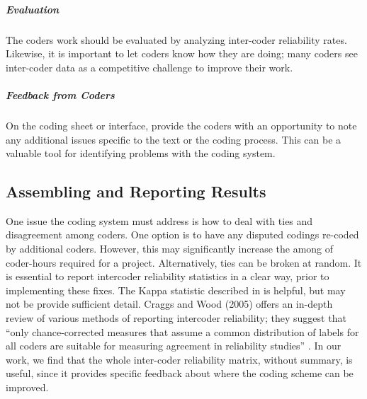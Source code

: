 \documentclass[oneside,letterpaper,titlepage]{article}
\begin{document}
\subparagraph{Evaluation} The coders work should be evaluated by
analyzing inter-coder reliability rates.  Likewise, it is important to
let coders know how they are doing; many coders see inter-coder data
as a competitive challenge to improve their work.

\subparagraph{Feedback from Coders} On the coding sheet or interface,
provide the coders with an opportunity to note any additional issues
specific to the text or the coding process. This can be a valuable
tool for identifying problems with the coding system.

\subsection{Assembling and Reporting Results} 

One issue the coding system must address is how to deal with ties and
disagreement among coders. One option is to have any disputed codings
re-coded by additional coders. However, this may significantly
increase the among of coder-hours required for a project.
Alternatively, ties can be broken at random.  It is essential to
report intercoder reliability statistics in a clear way, prior to
implementing these fixes.  The Kappa statistic described in
\cite{KwoShuHov06} is helpful, but may not be provide sufficient
detail. Craggs and Wood (2005) offers an in-depth review of various
methods of reporting intercoder reliability; they suggest that ``only
chance-corrected measures that assume a common distribution of labels
for all coders are suitable for measuring agreement in reliability
studies'' \citep{CraWoo05}.  In our work, we find that the whole
inter-coder reliability matrix, without summary, is useful, since it
provides specific feedback about where the coding scheme can be
improved.
 
 
\bibsep=0in 

\end{document}
